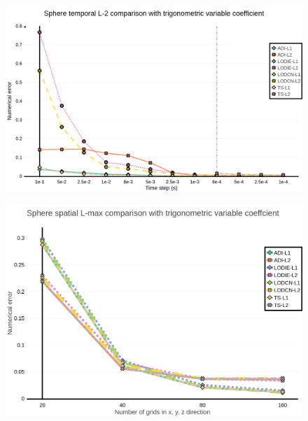 \documentclass[dissertation]{uathesis}
\begin{document}
\begin{body}
\begin{flushleft}
\begin{figure}[!tb] 
	\centering
	\includegraphics[width=13cm]{../figures/sphere_l2_2.png}
	\label{fig:sphere_temporal_l2_type_2}
\end{figure}

\begin{figure}[!tb] 
	\centering
	\includegraphics[width=13cm]{../figures/spatial_sphere_lmax_2.png}
	\label{fig:sphere_spatial_lmax_type_2}
\end{figure}


\end{flushleft}
\end{body}
\end{document}
